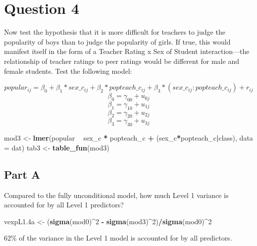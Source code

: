 \documentclass[]{article}
\newenvironment{Shaded}{\begin{snugshade}}{\end{snugshade}}
\newcommand{\KeywordTok}[1]{\textcolor[rgb]{0.13,0.29,0.53}{\textbf{#1}}}
\newcommand{\DataTypeTok}[1]{\textcolor[rgb]{0.13,0.29,0.53}{#1}}
\newcommand{\DecValTok}[1]{\textcolor[rgb]{0.00,0.00,0.81}{#1}}
\newcommand{\StringTok}[1]{\textcolor[rgb]{0.31,0.60,0.02}{#1}}
\newcommand{\OperatorTok}[1]{\textcolor[rgb]{0.81,0.36,0.00}{\textbf{#1}}}
\newcommand{\NormalTok}[1]{#1}
\begin{document}
\section{Question 4}\label{question-4}

Now test the hypothesis that it is more difficult for teachers to judge
the popularity of boys than to judge the popularity of girls. If true,
this would manifest itself in the form of a Teacher Rating x Sex of
Student interaction---the relationship of teacher ratings to peer
ratings would be different for male and female students. Test the
following model:

\[popular_{ij} = \beta_{0} + \beta_1*sex\_c_{ij}+ \beta_2 * popteach\_c_{ij} + \beta_3 * (sex\_c_{ij} : popteach\_c_{ij}) + r_{ij}\]
\[\beta_0 = \gamma_{00} + u_{0j}\] \[\beta_1 = \gamma_{10} + u_{1j}\]
\[\beta_2 = \gamma_{20} + u_{2j}\] \[\beta_3 = \gamma_{30} + u_{3j}\]

\begin{Shaded}
\begin{Highlighting}[]
\NormalTok{mod3 <-}\StringTok{ }\KeywordTok{lmer}\NormalTok{(popular }\OperatorTok{~}\StringTok{ }\NormalTok{sex_c }\OperatorTok{*}\StringTok{ }\NormalTok{popteach_c }\OperatorTok{+}\StringTok{ }\NormalTok{(sex_c}\OperatorTok{*}\NormalTok{popteach_c}\OperatorTok{|}\NormalTok{class), }\DataTypeTok{data =}\NormalTok{ dat)}
\NormalTok{tab3 <-}\StringTok{ }\KeywordTok{table_fun}\NormalTok{(mod3)}
\end{Highlighting}
\end{Shaded}

\subsection{Part A}\label{part-a-3}

Compared to the fully unconditional model, how much Level 1 variance is
accounted for by all Level 1 predictors?

\begin{Shaded}
\begin{Highlighting}[]
\NormalTok{vexpL1.4a <-}\StringTok{ }\NormalTok{(}\KeywordTok{sigma}\NormalTok{(mod0)}\OperatorTok{^}\DecValTok{2} \OperatorTok{-}\StringTok{ }\KeywordTok{sigma}\NormalTok{(mod3)}\OperatorTok{^}\DecValTok{2}\NormalTok{)}\OperatorTok{/}\KeywordTok{sigma}\NormalTok{(mod0)}\OperatorTok{^}\DecValTok{2}
\end{Highlighting}
\end{Shaded}

\(62\)\% of the variance in the Level 1 model is accounted for by all
predictors.
\end{document}
